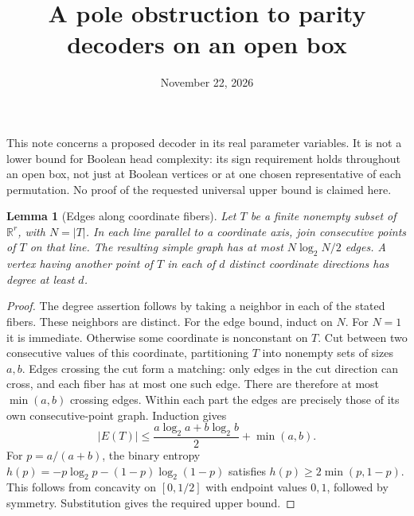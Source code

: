 \documentclass[11pt]{article}
\title{A pole obstruction to parity decoders on an open box}
\author{}
\date{November 22, 2026}
\newtheorem{lemma}[theorem]{Lemma}
\begin{document}
\maketitle

This note concerns a proposed decoder in its real parameter variables.
It is not a lower bound for Boolean head complexity: its sign requirement
holds throughout an open box, not just at Boolean vertices or at one
chosen representative of each permutation. No proof of the requested
universal upper bound is claimed here.

\begin{lemma}[Edges along coordinate fibers]
Let $T$ be a finite nonempty subset of $\mathbb R^r$, with $N=|T|$.
In each line parallel to a coordinate axis, join consecutive points of
$T$ on that line. The resulting simple graph has at most
$N\log_2 N/2$ edges. A vertex having another point of $T$ in each of
$d$ distinct coordinate directions has degree at least $d$.
\end{lemma}
\begin{proof}
The degree assertion follows by taking a neighbor in each of the stated
fibers. These neighbors are distinct. For the edge bound, induct on $N$.
For $N=1$ it is immediate. Otherwise some coordinate is nonconstant on
$T$. Cut between two consecutive values of this coordinate, partitioning
$T$ into nonempty sets of sizes $a,b$. Edges crossing the cut form a
matching: only edges in the cut direction can cross, and each fiber
has at most one such edge. There are therefore at most $\min(a,b)$
crossing edges. Within each part the edges are precisely those of its
own consecutive-point graph. Induction gives
\[
 |E(T)|\le\frac{a\log_2a+b\log_2b}{2}+\min(a,b).
\]
For $p=a/(a+b)$, the binary entropy
$h(p)=-p\log_2p-(1-p)\log_2(1-p)$ satisfies
$h(p)\ge2\min(p,1-p)$. This follows from concavity on $[0,1/2]$
with endpoint values $0,1$, followed by symmetry. Substitution gives
the required upper bound.
\end{proof}
\end{document}
